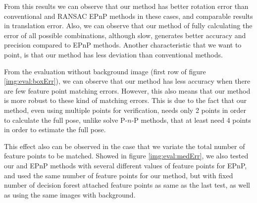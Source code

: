 \documentclass[annual]{acmsiggraph}
\begin{document}
From this results we can observe that our method has better rotation error than conventional and RANSAC EPnP methods in these cases, and comparable results in translation error. Also, we can observe that our method of fully calculating the error of all possible combinations, although slow, generates better accuracy and precision compared to EPnP methods. Another characteristic that we want to point, is that our method has less deviation than conventional methods.

From the evaluation without background image (first row of figure \ref{img:eval:boxErr}), we can observe that our method has less accuracy when there are few feature point matching errors. However, this also means that our method is more robust to these kind of matching errors. This is due to the fact that our method, even using multiple points for verification, needs only 2 points in order to calculate the full pose, unlike solve P-$n$-P methods, that at least need 4 points in order to estimate the full pose. 

This effect also can be observed in the case that we variate the total number of feature points to be matched. Showed in figure \ref{img:eval:medErr}, we also tested our and EPnP methods with several different values of feature points for EPnP, and used the same number of feature points for our method, but with fixed number of decision forest attached feature points as same as the last test, as well as using the same images with background. 
\end{document}
